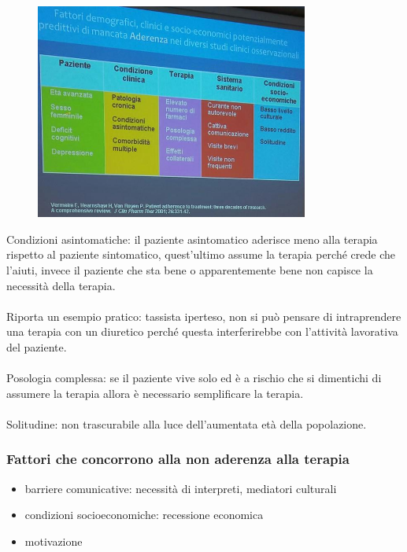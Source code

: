 \begin{figure}[!ht]
\centering
	\includegraphics[width=0.8\textwidth]{41/image5.jpeg}
	\end{figure}
	
Condizioni asintomatiche: il paziente asintomatico aderisce meno alla
terapia rispetto al paziente sintomatico, quest'ultimo assume la terapia
perché crede che l'aiuti, invece il paziente che sta bene o
apparentemente bene non capisce la necessità della terapia.
\\\\
Riporta un esempio pratico: tassista iperteso, non si può pensare di
intraprendere una terapia con un diuretico perché questa interferirebbe
con l'attività lavorativa del paziente.
\\\\
Posologia complessa: se il paziente vive solo ed è a rischio che si
dimentichi di assumere la terapia allora è necessario semplificare la
terapia.
\\\\
Solitudine: non trascurabile alla luce dell'aumentata età della
popolazione.

\subsubsection{Fattori che concorrono alla non aderenza alla terapia}

\begin{itemize}
\item
  barriere comunicative: necessità di interpreti, mediatori culturali
\item
  condizioni socioeconomiche: recessione economica
\item
  motivazione
\end{itemize}

